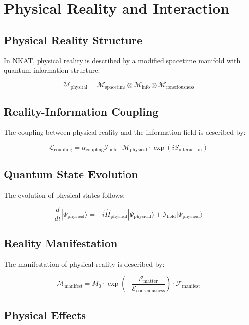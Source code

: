 \section{Physical Reality and Interaction}

\subsection{Physical Reality Structure}

In NKAT, physical reality is described by a modified spacetime manifold with quantum information structure:

\[
\mathcal{M}_{\text{physical}} = \mathcal{M}_{\text{spacetime}} \otimes \mathcal{M}_{\text{info}} \otimes \mathcal{M}_{\text{consciousness}}
\]

\subsection{Reality-Information Coupling}

The coupling between physical reality and the information field is described by:

\[
\mathcal{L}_{\text{coupling}} = \alpha_{\text{coupling}} \mathcal{I}_{\text{field}} \cdot \mathcal{M}_{\text{physical}} \cdot \exp(iS_{\text{interaction}})
\]

\subsection{Quantum State Evolution}

The evolution of physical states follows:

\[
\frac{d}{dt}|\Psi_{\text{physical}}\rangle = -i\hat{H}_{\text{physical}}|\Psi_{\text{physical}}\rangle + \mathcal{I}_{\text{field}}|\Psi_{\text{physical}}\rangle
\]

\subsection{Reality Manifestation}

The manifestation of physical reality is described by:

\[
\mathcal{M}_{\text{manifest}} = M_0 \cdot \exp\left(-\frac{\mathcal{E}_{\text{matter}}}{\mathcal{E}_{\text{consciousness}}}\right) \cdot \mathcal{F}_{\text{manifest}}
\]

\subsection{Physical Effects}

